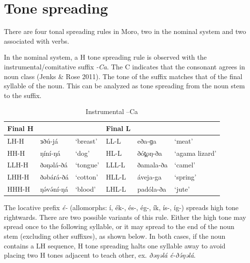 \section{Tone spreading}
There are four tonal spreading rules in Moro, two in the nominal system and two associated with verbs.

In the nominal system, a H tone spreading rule is observed with the instrumental/comitative suffix \textit{-Ca}. The C indicates that the consonant agrees in noun class (Jenks \& Rose 2011). The tone of the suffix matches that of the final syllable of the noun. This can be analyzed as tone spreading from the noun stem to the suffix. 

\begin{table}
\caption{Instrumental –Ca}
	\begin{tabular}[t]{llllll}
		Final H & & &  Final L\\\hline
LH-H	&	ɜðú-já	&	‘breast'	&	LL-L		&	eða-ɡa	&	‘meat’\\
HH-H	&	ŋíní-ŋá	&	‘dog’	&	HL-L		&	ðót̪oŋ-ða	&	‘agama lizard’\\
LLH-H	&	ðəŋəlá-ðá	&	‘tongue’	&LLL-L	&	ðamala-ða	&	‘camel’\\
LHH-H	&	ðəbáɾá-ðá	&	‘cotton’		&	HLL-L	&	áveja-ga	&	‘spring’\\
HHH-H	&	ŋə́və́ní-ŋá		&	‘blood’		&	LHL-L	&	padóla-ða	&	‘jute’ \\
	\end{tabular}
  \label{tab:ch4:2}
\end{table}

The locative prefix \textit{é-} (allomorphs: í, ék-, és-, ég-, ík, ís-, íg-) spreads high tone rightwards. There are two possible variants of this rule. Either the high tone may spread once to the following syllable, or it may spread to the end of the noun stem (excluding other suffixes), as shown below. In both cases, if the noun contains a LH sequence, H tone spreading halts one syllable away to avoid placing two H tones adjacent to teach other, ex. \textit{ðəŋəlá  é-ðə́ŋəlá}.


